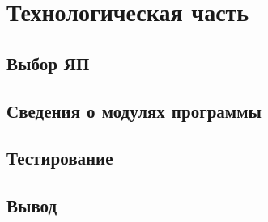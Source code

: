 \chapter{Технологическая часть}

\section{Выбор ЯП}



\section{Сведения о модулях программы}




\section{Тестирование}



\section{Вывод}

